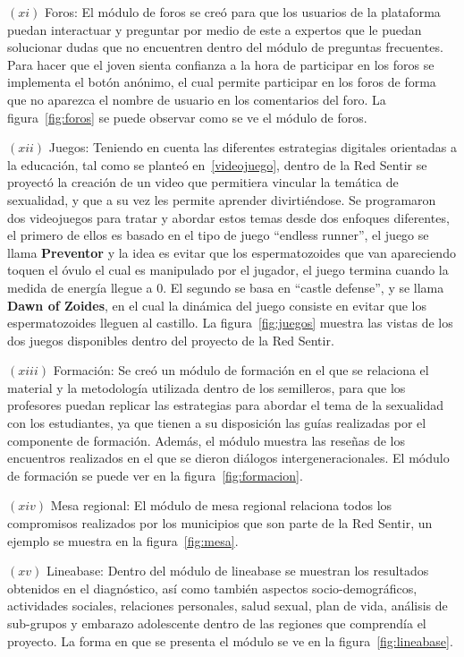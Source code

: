 \documentclass[journal,transmag]{IEEEtran}
\begin{document}
$(xi)$ Foros: El módulo de foros se creó para que los usuarios de la plataforma puedan interactuar y preguntar por medio de este a expertos que le puedan solucionar dudas que no encuentren dentro del módulo de preguntas frecuentes. Para hacer que el joven sienta confianza a la hora de participar en los foros se implementa el botón anónimo, el cual permite participar en los foros de forma que no aparezca el nombre de usuario en los comentarios del foro. La figura~\ref{fig:foros} se puede observar como se ve el módulo de foros.

$(xii)$ Juegos: Teniendo en cuenta las diferentes estrategias digitales orientadas a la educación, tal como se planteó en~\ref{videojuego}, dentro de la Red Sentir se proyectó la creación de un video que permitiera vincular la temática de sexualidad, y que a su vez les permite aprender divirtiéndose. Se programaron dos videojuegos para tratar y abordar estos temas desde dos enfoques diferentes, el primero de ellos es basado en el tipo de juego ``endless runner'', el juego se llama \textbf{Preventor} y la idea es evitar que los espermatozoides que van apareciendo toquen el óvulo el cual es manipulado por el jugador, el juego termina cuando la medida de energía llegue a $0$. El segundo se basa en ``castle defense'', y se llama \textbf{Dawn of Zoides}, en el cual la dinámica del juego consiste en evitar que los espermatozoides lleguen al castillo.  La figura~\ref{fig:juegos} muestra las vistas de los dos juegos disponibles dentro del proyecto de la Red Sentir.

$(xiii)$ Formación: Se creó un módulo de formación en el que se relaciona el material y la metodología utilizada dentro de los semilleros, para que los profesores puedan replicar las estrategias para abordar el tema de la sexualidad con los estudiantes, ya que tienen a su disposición las guías realizadas por el componente de formación. Además, el módulo muestra las reseñas de los encuentros realizados en el que se dieron diálogos intergeneracionales. El módulo de formación se puede ver en la figura~\ref{fig:formacion}.

$(xiv)$ Mesa regional: El módulo de mesa regional relaciona todos los compromisos realizados por los municipios que son parte de la Red Sentir, un ejemplo se muestra en la figura~\ref{fig:mesa}.

$(xv)$ Lineabase: Dentro del módulo de lineabase se muestran los resultados obtenidos en el diagnóstico, así como también aspectos socio-demográficos, actividades sociales, relaciones personales, salud sexual, plan de vida, análisis de sub-grupos y embarazo adolescente dentro de las regiones que comprendía el proyecto. La forma en que se presenta el módulo se ve en la figura~\ref{fig:lineabase}.
\end{document}

